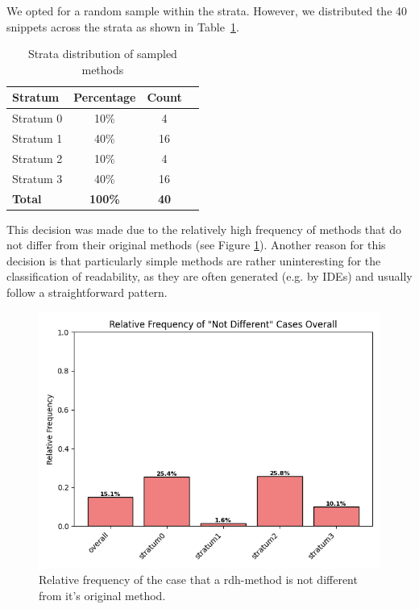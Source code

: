 \documentclass[%
class=scrreprt,
chapterprefix=false,%
open=right,%
twoside=false,%
paper=a4,%
logofile={Logo\_zentral\_farbig\_EN.png},%
thesistype=master,%
UKenglish,%
]{se2thesis}
\theoremstyle{definition}
\begin{document}
	We opted for a random sample within the strata. However, we distributed the 40 snippets across the strata as shown in Table~\ref{tab:sampled_methods}.
	
	\begin{table}[htbp]
		\centering
		\begin{tabular}{lccc}
			\toprule
			\textbf{Stratum} & \textbf{Percentage} & \textbf{Count} \\
			\midrule
			Stratum 0 & 10\% & 4 \\
			Stratum 1 & 40\% & 16 \\
			Stratum 2 & 10\% & 4 \\
			Stratum 3 & 40\% & 16 \\
			\midrule
			\textbf{Total} & \textbf{100\%} & \textbf{40} \\
			\bottomrule
		\end{tabular}
		\caption{Strata distribution of sampled methods}
		\label{tab:sampled_methods}
	\end{table}
	
	This decision was made due to the relatively high frequency of methods that do not differ from their original methods (see Figure \ref{fig:sampling_not_different_overall}). Another reason for this decision is that particularly simple methods are rather uninteresting for the classification of readability, as they are often generated (e.g. by IDEs) and usually follow a straightforward pattern.
	
	\begin{figure}[t]
		\centering
		\includegraphics[width=\textwidth]{img/sampling_not_different_overall.png}
		\caption{Relative frequency of the case that a rdh-method is not different from it's original method.} 
		\label{fig:sampling_not_different_overall}
	\end{figure}
		
\end{document}
